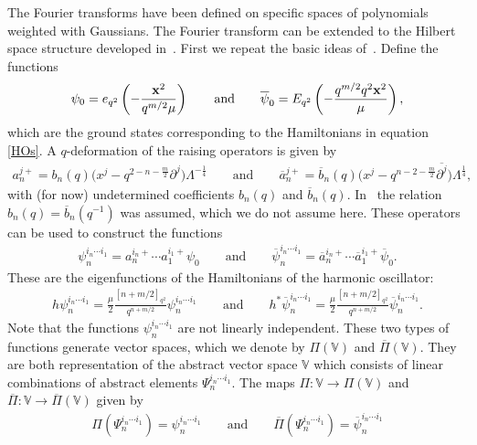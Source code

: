 \documentclass[pdftex]{sigma}
\newcommand{\mV}{\mathbb{V}}
\numberwithin{equation}{section}
\begin{document}
The Fourier transforms have been def\/ined on specif\/ic spaces of polynomials weighted with Gaussians. The Fourier transform can be extended to the Hilbert space structure developed in~\cite{MR1239953}. First we repeat the basic ideas of~\cite{MR1288667, MR1239953}. Def\/ine the functions
\begin{gather*}
\psi_0=e_{q^2}\left(-\frac{\bold{x}^2}{q^{m/2}\mu}\right)\qquad \mbox{and} \qquad \overline{\psi}_0=E_{q^2}\left(-\frac{q^{m/2}q^2\bold{x}^2}{\mu}\right),
\end{gather*}
which are the ground states corresponding to the Hamiltonians in equation \eqref{HOs}. A $q$-deformation of the raising operators is given by
\begin{gather*}
a^{j+}_n=b_n(q)\big(x^j-q^{2-n-\frac{m}{2}}\partial^j\big)\Lambda^{-\frac{1}{4}}\qquad
\mbox{and} \qquad \overline{a}^{j+}_n=\overline{b}_n(q)\big(x^j-q^{n-2-\frac{m}{2}}\overline{\partial^j}\big)\Lambda^{\frac{1}{4}},
\end{gather*}
with (for now) undetermined coef\/f\/icients $b_n(q)$ and $\overline{b}_n(q)$. In~\cite{MR1239953} the relation $b_n(q)=\overline{b}_n(q^{-1})$ was assumed, which we do not assume here.
These operators can be used to construct the functions
\begin{gather*}
\psi^{i_n\cdots i_1}_n=a^{i_n+}_n\cdots a^{i_1+}_1\psi_0 \qquad \mbox{and} \qquad \overline{\psi}^{i_n\cdots i_1}_n=\overline{a}^{i_n+}_n\cdots \overline{a}^{i_1+}_1\overline{\psi}_0.
\end{gather*}
These are the eigenfunctions of the Hamiltonians of the harmonic oscillator:
\begin{gather}
\label{eigwaarden}
h\psi^{i_n\cdots i_1}_n=\frac{\mu}{2}\frac{[n+m/2]_{q^2}}{q^{n+m/2}}\psi^{i_n\cdots i_1}_n \qquad \mbox{and} \qquad h^\ast\overline{\psi}^{i_n\cdots i_1}_n=\frac{\mu}{2}\frac{[n+m/2]_{q^2}}{q^{n+m/2}}\overline{\psi}^{i_n\cdots i_1}_n.
\end{gather}
Note that the functions $\psi^{i_n\cdots i_1}_n$ are not linearly independent.
These two types of functions generate vector spaces, which we denote by $\Pi(\mV)$ and $\overline{\Pi}(\mV)$. They are both representation of the abstract vector space $\mV$ which consists of linear combinations of abstract elements $\Psi_n^{i_n\cdots i_1}$. The maps $\Pi:\mV\to\Pi(\mV)$ and $\overline{\Pi}:\mV\to\overline{\Pi}(\mV)$ given by
\begin{gather*}
\Pi(\Psi^{i_n\cdots i_1}_n)=\psi^{i_n\cdots i_1}_n \qquad \mbox{and}\qquad \overline{\Pi}(\Psi^{i_n\cdots i_1}_n)=\overline{\psi}^{i_n\cdots i_1}_n
\end{gather*}
\end{document}
